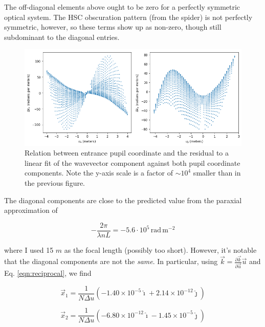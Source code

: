\documentclass{article}
\begin{document}
The off-diagonal elements above ought to be zero for a perfectly symmetric optical system.  The HSC
obscuration pattern (from the spider) is not perfectly symmetric, however, so these terms show up as
non-zero, though still subdominant to the diagonal entries.

\begin{figure}
    \includegraphics[scale=0.7]{dku.png}

    \caption{Relation between entrance pupil coordinate and the residual to a linear fit of the
    wavevector component against both pupil coordinate components.  Note the y-axis scale is a
    factor of $\sim 10^4$ smaller than in the previous figure.}

    \label{fig:dku}
\end{figure}

The diagonal components are close to the predicted value from the paraxial approximation of

\begin{equation}
    -\frac{2 \pi}{\lambda n L} = -5.6 \cdot 10^5 \mathrm{\,rad\,m^{-2}}
\end{equation}

where I used 15 $m$ as the focal length (possibly too short).  However, it's notable that the
diagonal components are not the \textit{same}.  In particular, using $\vec{k} = \frac{\partial
\vec{k}}{\partial \vec{u}} \vec{u}$ and Eq. \ref{eqn:reciprocal}, we find

\begin{equation}
    \vec{x}_1 = \frac{1}{N \Delta u} (-1.40 \times 10^{-5} \hat{\imath} + 2.14 \times 10^{-12} \hat{\jmath})
\end{equation}

\begin{equation}
    \vec{x}_2 = \frac{1}{N \Delta u} (-6.80 \times 10^{-12} \hat{\imath} - 1.45 \times 10^{-5} \hat{\jmath})
\end{equation}
\end{document}
